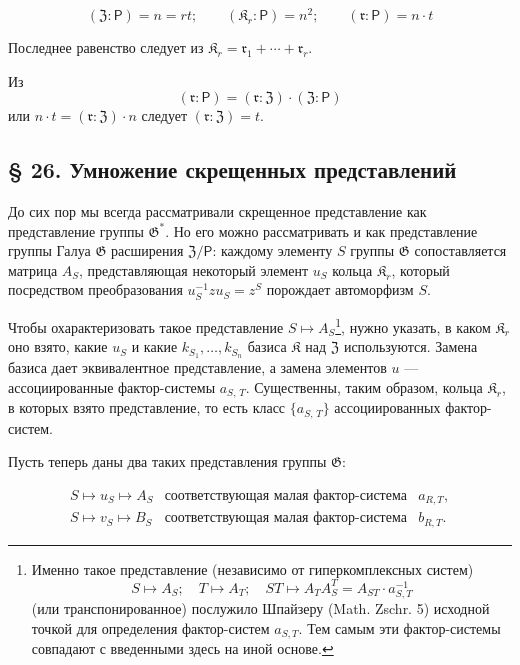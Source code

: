 \documentclass[11pt]{article}
\newcommand{\srcfn}[2]{\footnote{#2}}
\begin{document}
\[
(\mathfrak Z:\mathsf{P})=n=rt;\qquad (\mathfrak K_r:\mathsf{P})=n^2;\qquad (\mathfrak r:\mathsf{P})=n\cdot t
\]

Последнее равенство следует из \(\mathfrak K_r = \mathfrak{r}_1 + \cdots + \mathfrak{r}_r\).

Из
\[(\mathfrak{r}: \mathsf{P}) = (\mathfrak{r}: \mathfrak Z) \cdot (\mathfrak Z: \mathsf{P})\]
или \(n \cdot t = (\mathfrak{r}: \mathfrak Z) \cdot n\) следует \((\mathfrak{r}: \mathfrak Z) = t\).

\subsection*{§ 26. Умножение скрещенных представлений}\label{multiplikation-der-verschraenkten-darstellungen}

До сих пор мы всегда рассматривали скрещенное представление как представление группы \(\mathfrak{G}^*\). Но его можно рассматривать и как представление группы Галуа \(\mathfrak{G}\) расширения \(\mathfrak Z/\mathsf{P}\): каждому элементу \(S\) группы \(\mathfrak{G}\) сопоставляется матрица \(A_S\), представляющая некоторый элемент \(u_S\) кольца \(\mathfrak K_r\), который посредством преобразования \(u_S^{-1}zu_S=z^S\) порождает автоморфизм \(S\).

Чтобы охарактеризовать такое представление \(S\mapsto A_S\)\srcfn{1}{Именно такое представление (независимо от гиперкомплексных систем)
\[
S\mapsto A_S;\quad T\mapsto A_T;\quad ST\mapsto A_TA_S^T=A_{ST}\cdot a_{S,T}^{-1}
\]
(или транспонированное) послужило Шпайзеру (Math. Zschr. 5) исходной точкой для определения фактор-систем \(a_{S,T}\). Тем самым эти фактор-системы совпадают с введенными здесь на иной основе.}, нужно указать, в каком \(\mathfrak K_r\) оно взято, какие \(u_S\) и какие \(k_{S_1},\ldots,k_{S_n}\) базиса \(\mathfrak K\) над \(\mathfrak Z\) используются. Замена базиса дает эквивалентное представление, а замена элементов \(u\) --- ассоциированные фактор-системы \(a_{S,\,T}\). Существенны, таким образом, кольца \(\mathfrak K_r\), в которых взято представление, то есть класс \(\{a_{S,\,T}\}\) ассоциированных фактор-систем.

Пусть теперь даны два таких представления группы \(\mathfrak G\):

\[
\begin{array}{lll}
S\mapsto u_S\mapsto A_S & \text{соответствующая малая фактор-система} & a_{R,T},\\
S\mapsto v_S\mapsto B_S & \text{соответствующая малая фактор-система} & b_{R,T}.
\end{array}
\]
\end{document}
